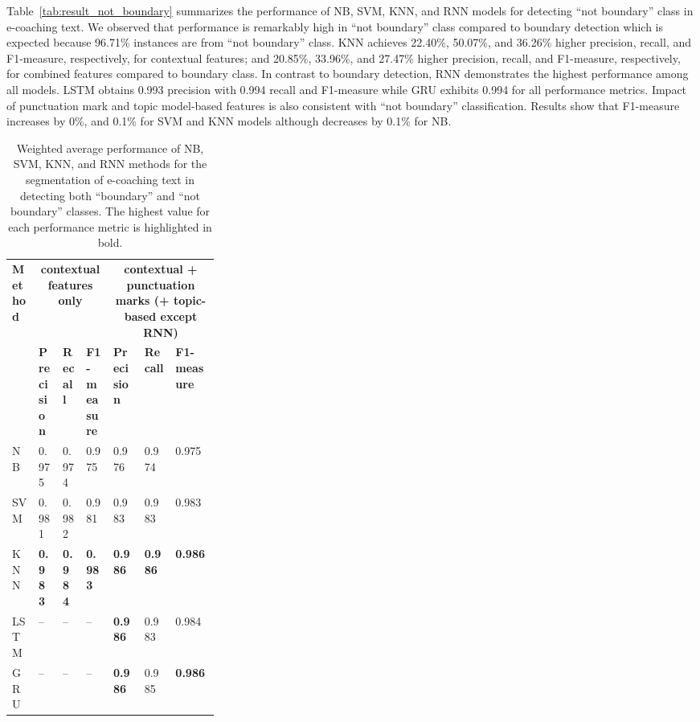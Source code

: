 \documentclass{amia}
\begin{document}
Table~\ref{tab:result_not_boundary} summarizes the performance of NB, SVM, KNN, and RNN models for detecting ``not boundary'' class in e-coaching text. We observed that performance is remarkably high in ``not boundary'' class compared to boundary detection which is expected because 96.71\% instances are from ``not boundary'' class. KNN achieves 22.40\%, 50.07\%, and 36.26\% higher precision, recall, and F1-measure, respectively, for contextual features; and 20.85\%, 33.96\%, and 27.47\% higher precision, recall, and F1-measure, respectively, for combined features compared to boundary class. In contrast to boundary detection, RNN demonstrates the highest performance among all models. LSTM obtains 0.993 precision with 0.994 recall and F1-measure while GRU exhibits 0.994 for all performance metrics. Impact of punctuation mark and topic model-based features is also consistent with ``not boundary'' classification. Results show that F1-measure increases by 0\%, and 0.1\% for SVM and KNN models although decreases by 0.1\% for NB. \\

\begin{table}[ht]
\centering
\caption{Weighted average performance of NB, SVM, KNN, and RNN methods for the segmentation of e-coaching text in detecting both ``boundary'' and ``not boundary'' classes. The highest value for each performance metric is highlighted in bold.}
\label{tab:result_weighted_avg}
  \begin{tabular}{|l|l|l|l|p{0.15\linewidth}|p{0.15\linewidth}|l|}
  \hline
   \multirow{2}{*}{\textbf{Method}} & \multicolumn{3}{|c|}{\textbf{contextual features only}} & \multicolumn{3}{|c|}{\textbf{contextual + punctuation marks (+ topic-based except RNN)}} \\\cline{2-7}
   & \textbf{Precision}  & \textbf{Recall} & \textbf{F1-measure} & \textbf{Precision}  & \textbf{Recall} & \textbf{F1-measure}\\ \hline    
    
 NB & 0.975 & 0.974 & 0.975 & 0.976 & 0.974 & 0.975 \\ \hline
 SVM & 0.981 & 0.982 & 0.981 & 0.983 & 0.983 & 0.983\\ \hline
 KNN & \textbf{0.983} & \textbf{0.984} & \textbf{0.983} & \textbf{0.986} & \textbf{0.986} & \textbf{0.986}\\ \hline
 LSTM & -- & -- & -- & \textbf{0.986} & 0.983 & 0.984 \\ \hline
 GRU & -- & -- & -- & \textbf{0.986} & 0.985 & \textbf{0.986} \\ \hline 
  \end{tabular}
\end{table} 
\end{document}
